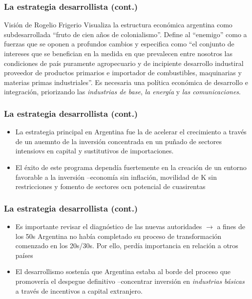 \documentclass[14pt,aspectratio=169]{beamer}
\begin{document}
\begin{frame}\frametitle{La estrategia desarrollista (cont.)}
                 \begin{block}{Visión de Rogelio Frigerio}
Visualiza la estructura económica argentina como subdesarrollada
``fruto de cien años de colonialismo''. Define al ``enemigo'' como a
fuerzas que se oponen a profundos cambios y especifica como ``el
conjunto de intereses que se benefician en la medida en que prevalecen
entre nosotros las condiciones de país puramente agropecuario y de
incipiente desarrollo industiral proveedor de productos primarios e
importador de combustibles, maquinarias y materias primas
industriales''. Es necesaria una política económica de desarrollo e
integración, priorizando las \textit{industrias de base}, \textit{la
  energía} y \textit{las comunicaciones}. 
\end{block}
                 \end{frame}
                 


\begin{frame}\frametitle{La estrategia desarrollista (cont.)}
                 \begin{itemize}\itemsep 5pt \medskip
                 \item La estrategia principal en Argentina fue la de
                   acelerar el crecimiento a través de un auemnto de
                   la inversión concentrada en un puñado de sectores
                   intensiovs en capital y sustitutivos de
                   importaciones.
                   \item El éxito de este programa dependía
                     fuertemente en la creación de un entorno
                     favorable a la inversión --economía sin
                     inflación, movilidad de K sin restricciones y
                     fomento de sectores ocn potencial de cuasirentas
                   \end{itemize}
               \end{frame}



\begin{frame}\frametitle{La estrategia desarrollista (cont.)}
                 \begin{itemize}\itemsep 5pt \medskip
                 \item Es importante revisar el diagnóstico de las
                   nuevas autoridades $\longrightarrow$ a fines de los
                   50s Argentina no había completado su proceso de
                   transformación comenzado en los 20s/30s. Por ello,
                   perdía importancia en relación a otros países
                   \item El desarrollismo sostenía que Argentina
                     estaba al borde del proceso que promovería el
                     despegue definitivo --concentrar inversión en
                     \textit{industrias básicas} a través de incentivos a
                     capital extranjero.
                   \end{itemize}
               \end{frame}
\end{document}
